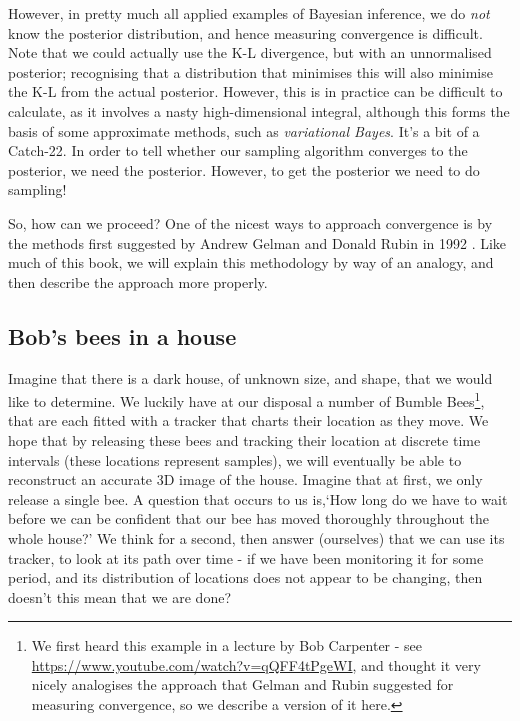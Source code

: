 \documentclass[11pt,fullpage]{book}
\begin{document}
However, in pretty much all applied examples of Bayesian inference, we do \textit{not} know the posterior distribution, and hence measuring convergence is difficult. Note that we could actually use the K-L divergence, but with an unnormalised posterior; recognising that a distribution that minimises this will also minimise the K-L from the actual posterior. However, this is in practice can be difficult to calculate, as it involves a nasty high-dimensional integral, although this forms the basis of some approximate methods, such as \textit{variational Bayes}. It's a bit of a Catch-22. In order to tell whether our sampling algorithm converges to the posterior, we need the posterior. However, to get the posterior we need to do sampling!

So, how can we proceed? One of the nicest ways to approach convergence is by the methods first suggested by Andrew Gelman and Donald Rubin in 1992 \cite{gelman1992inference}. Like much of this book, we will explain this methodology by way of an analogy, and then describe the approach more properly.

\subsection{Bob's bees in a house}

Imagine that there is a dark house, of unknown size, and shape, that we would like to determine. We luckily have at our disposal a number of Bumble Bees\footnote{We first heard this example in a lecture by Bob Carpenter - see \url{https://www.youtube.com/watch?v=qQFF4tPgeWI}, and thought it very nicely analogises the approach that Gelman and Rubin suggested for measuring convergence, so we describe a version of it here.}, that are each fitted with a tracker that charts their location as they move. We hope that by releasing these bees and tracking their location at discrete time intervals (these locations represent samples), we will eventually be able to reconstruct an accurate 3D image of the house. Imagine that at first, we only release a single bee. A question that occurs to us is,`How long do we have to wait before we can be confident that our bee has moved thoroughly throughout the whole house?' We think for a second, then answer (ourselves) that we can use its tracker, to look at its path over time - if we have been monitoring it for some period, and its distribution of locations does not appear to be changing, then doesn't this mean that we are done? 
\end{document}
